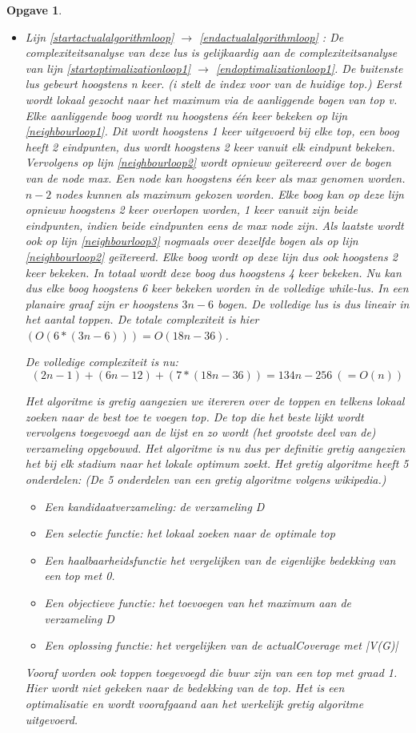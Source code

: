 \documentclass[11pt, a4paper]{article}
\newtheorem{opgave}{Opgave}
\begin{document}
\begin{opgave}
\begin{itemize}
			\item Lijn \ref{startactualalgorithmloop} $\rightarrow$ \ref{endactualalgorithmloop} : De complexiteitsanalyse van deze lus is gelijkaardig aan de complexiteitsanalyse van lijn \ref{startoptimalizationloop1} $\rightarrow$ \ref{endoptimalizationloop1}. De buitenste lus gebeurt hoogstens n keer. (i stelt de index voor van de huidige top.) Eerst wordt lokaal gezocht naar het maximum via de aanliggende bogen van top v. Elke aanliggende boog wordt nu hoogstens \'{e}\'{e}n keer bekeken op lijn \ref{neighbourloop1}. Dit wordt hoogstens 1 keer uitgevoerd bij elke top, een boog heeft 2 eindpunten, dus wordt hoogstens 2 keer vanuit elk eindpunt bekeken. Vervolgens op lijn \ref{neighbourloop2} wordt opnieuw ge\"{i}tereerd over de bogen van de node max. Een node kan hoogstens \'{e}\'{e}n keer als max genomen worden. $n-2$ nodes kunnen als maximum gekozen worden. Elke boog kan op deze lijn opnieuw hoogstens 2 keer overlopen worden, 1 keer vanuit zijn beide eindpunten, indien beide eindpunten eens de max node zijn. Als laatste wordt ook op lijn \ref{neighbourloop3} nogmaals over dezelfde bogen als op lijn \ref{neighbourloop2} ge\"{i}tereerd. Elke boog wordt op deze lijn dus ook hoogstens 2 keer bekeken. In totaal wordt deze boog dus hoogstens 4 keer bekeken. Nu kan dus elke boog hoogstens 6 keer bekeken worden in de volledige while-lus. In een planaire graaf zijn er hoogstens $3n-6$ bogen. De volledige lus is dus lineair in het aantal toppen. De totale complexiteit is hier $(O(6*(3n-6)))=O(18n-36)$.
		
		
		De volledige complexiteit is nu: 
		\[(2n-1)+(6n-12)+(7*(18n-36))=134n-256\ (=O(n))\]
		
			Het algoritme is gretig aangezien we itereren over de toppen en telkens lokaal zoeken naar de best toe te voegen top. De top die het beste lijkt wordt vervolgens toegevoegd aan de lijst en zo wordt (het grootste deel van de) verzameling opgebouwd. Het algoritme is nu dus per definitie gretig aangezien het bij elk stadium naar het lokale optimum zoekt.
			Het gretig algoritme heeft 5 onderdelen: (De 5 onderdelen van een gretig algoritme volgens wikipedia.)
			\begin{itemize}
				\item Een kandidaatverzameling: de verzameling D
				\item Een selectie functie: het lokaal zoeken naar de optimale top
				\item Een haalbaarheidsfunctie het vergelijken van de eigenlijke bedekking van een top met 0. 
				\item Een objectieve functie: het toevoegen van het maximum aan de verzameling D
				\item Een oplossing functie: het vergelijken van de actualCoverage met |V(G)|
			\end{itemize} 
			 Vooraf worden ook toppen toegevoegd die buur zijn van een top met graad 1. Hier wordt niet gekeken naar de bedekking van de top. Het is een optimalisatie en wordt voorafgaand aan het werkelijk gretig algoritme uitgevoerd. 
		\end{itemize}
\end{opgave}
\end{document}
